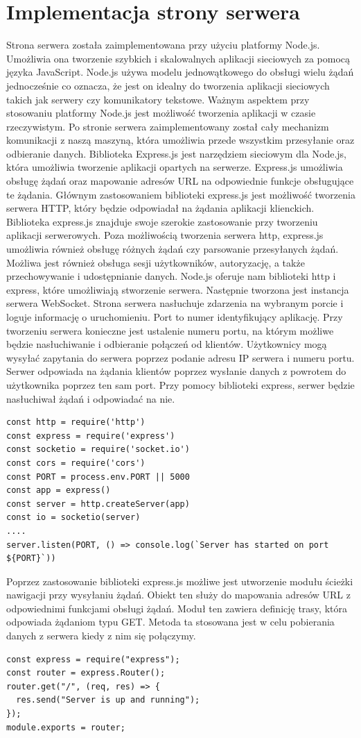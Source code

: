 \section{Implementacja strony serwera}
Strona serwera została zaimplementowana przy użyciu platformy Node.js. Umożliwia ona tworzenie szybkich i skalowalnych aplikacji sieciowych za pomocą języka JavaScript. Node.js używa modelu jednowątkowego do obsługi wielu żądań jednocześnie co oznacza, że jest on idealny do tworzenia aplikacji sieciowych takich jak serwery czy komunikatory tekstowe. Ważnym aspektem przy stosowaniu platformy Node.js jest możliwość tworzenia aplikacji w czasie rzeczywistym. Po stronie serwera zaimplementowany został cały mechanizm komunikacji z naszą maszyną, która umożliwia przede wszystkim przesyłanie oraz odbieranie danych.
Biblioteka Express.js  jest narzędziem sieciowym dla Node.js, która umożliwia tworzenie aplikacji opartych na serwerze. Express.js umożliwia obsługę żądań oraz mapowanie adresów URL na odpowiednie funkcje obsługujące te żądania. Głównym zastosowaniem biblioteki express.js jest możliwość tworzenia serwera HTTP, który będzie odpowiadał na żądania aplikacji klienckich. Biblioteka express.js znajduje swoje szerokie zastosowanie przy tworzeniu aplikacji serwerowych. Poza możliwością tworzenia serwera http, express.js umożliwia również obsługę różnych żądań czy parsowanie przesyłanych żądań. Możliwa jest również obsługa sesji użytkowników, autoryzację, a także przechowywanie i udostępnianie danych.
Node.js oferuje nam biblioteki http i express, które umożliwiają stworzenie serwera. Następnie tworzona jest instancja serwera WebSocket. Strona serwera nasłuchuje zdarzenia na wybranym porcie i loguje informację o uruchomieniu. Port to numer identyfikujący aplikację. Przy tworzeniu serwera konieczne jest ustalenie numeru portu, na którym możliwe będzie nasłuchiwanie i odbieranie połączeń od klientów. Użytkownicy mogą wysyłać zapytania do serwera poprzez podanie adresu IP serwera i numeru portu. Serwer odpowiada na żądania klientów poprzez wysłanie danych z powrotem do użytkownika poprzez ten sam port. Przy pomocy biblioteki express, serwer będzie nasłuchiwał żądań i odpowiadać na nie. 
\begin{lstlisting}[caption=Implementacja serwera]
const http = require('http')
const express = require('express')
const socketio = require('socket.io')
const cors = require('cors')
const PORT = process.env.PORT || 5000
const app = express()
const server = http.createServer(app)
const io = socketio(server)
....
server.listen(PORT, () => console.log(`Server has started on port ${PORT}`))
\end{lstlisting}
Poprzez zastosowanie biblioteki express.js możliwe jest utworzenie modułu ścieżki nawigacji przy wysyłaniu żądań. Obiekt ten służy do mapowania adresów URL z odpowiednimi funkcjami obsługi żądań. Moduł ten zawiera definicję trasy, która odpowiada żądaniom typu GET. Metoda ta stosowana jest w celu pobierania danych z serwera kiedy z nim się połączymy.
\begin{lstlisting}[caption=Implementacja sciezki serwera]
const express = require("express");
const router = express.Router();
router.get("/", (req, res) => {
  res.send("Server is up and running");
});
module.exports = router;
\end{lstlisting}
